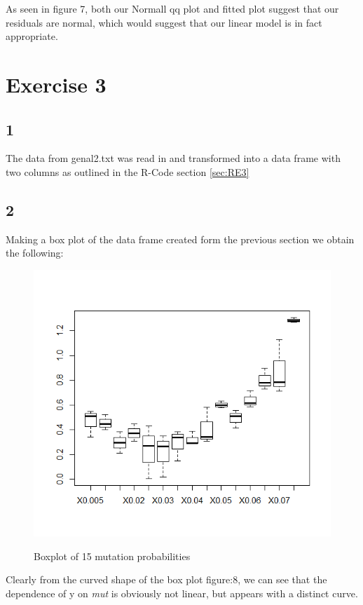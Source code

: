 \documentclass{article}
\begin{document}
As seen in figure 7, both our Normall qq plot and fitted plot suggest that our residuals are normal, which would suggest that our linear model is in fact appropriate.

  \section*{Exercise 3}
    \subsection*{1}
    The data from genal2.txt was read in and transformed into a data frame with two columns as outlined in the R-Code section \ref{sec:RE3}
    \subsection*{2}
    Making a box plot of the data frame created form the previous section we obtain the following:
    	\begin{figure}[H]
    		\centering
    		\includegraphics[scale=0.4]{../results/3_2.png}
    		\label{BoxMut}
    		\caption{Boxplot of 15 mutation probabilities}
   
    	\end{figure}
    Clearly from the curved shape of the box plot figure:8, we can see that the dependence of y on \textit{mut} is obviously not linear, but appears with a distinct curve.
\end{document}
